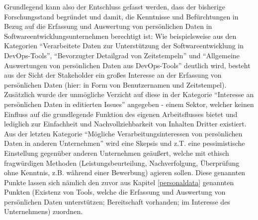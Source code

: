 Grundlegend kann also der Entschluss gefasst werden, dass der bisherige Forschungsstand begründet und damit, die Kenntnisse und Befürchtungen in Bezug auf die Erfassung und Auswertung von persönlichen Daten in Softwareentwicklungsunternehmen berechtigt ist: Wie beispielsweise aus den Kategorien \enquote{Verarbeitete Daten zur Unterstützung
der Softwareentwicklung in DevOps-Tools}, \enquote{Bevorzugter Detailgrad von Zeitstempeln} und \enquote{Allgemeine Auswertungen von persönlichen Daten aus DevOps-Tools} deutlich wird, besteht aus der Sicht der Stakeholder ein großes Interesse an der Erfassung von persönlichen Daten (hier: in Form
von Benutzernamen und Zeitstempel). Zusätzlich wurde der unmögliche Verzicht auf diese in der Kategorie \enquote{Interesse an persönlichen Daten in editierten Issues} angegeben - einem Sektor, welcher keinen Einfluss auf die grundlegende Funktion des eigenen Arbeitsflusses bietet
und lediglich zur Einfachheit und Nachvollziehbarkeit von Inhalten Dritter existiert. \newline Aus der letzten Kategorie \enquote{Mögliche Verarbeitungsinteressen von persönlichen Daten in anderen Unternehmen} wird eine Skepsis und z.T. eine pessimistische Einstellung gegenüber anderen Unternehmen geäußert, welche mit ethisch fragwürdigen Methoden (Leistungsbeurteilung, Nachverfolgung,
Überprüfung ohne Kenntnis, z.B. während einer Bewerbung) agieren sollen. Diese genannten Punkte lassen sich nämlich den zuvor aus Kapitel \ref{personaldata} genannten Punkten (Existenz von Tools, welche die Erfassung und Auswertung von persönlichen Daten unterstützen; Bereitschaft vorhanden; im Interesse des Unternehmens) zuordnen.

